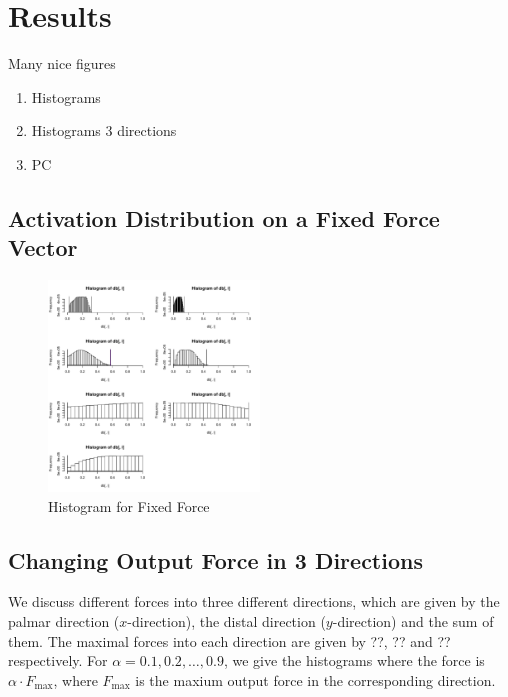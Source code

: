 \section{Results}
Many nice figures
\begin{enumerate}
	\item Histograms
	\item Histograms 3 directions
	\item PC
\end{enumerate}

\subsection{Activation Distribution on a  Fixed Force Vector}

\begin{figure}[ht]
   \begin{center}
    \includegraphics[width=0.5\textwidth]{figs/raw_histograms.pdf}
  \end{center}
  \caption{Histogram for Fixed Force}
  \label{fig_rawhisto}
\end{figure}

\subsection{Changing Output Force in 3 Directions}
We discuss different forces into three different directions, which are given by the palmar direction ($x$-direction), the distal direction ($y$-direction) and the sum of them. The maximal forces into each direction are given by ??, ?? and ?? respectively. For $\alpha = 0.1, 0.2, \dots, 0.9$, we give the histograms where the force is $\alpha \cdot F_{\max}$, where $F_{\max}$ is the maxium output force in the corresponding direction. 

